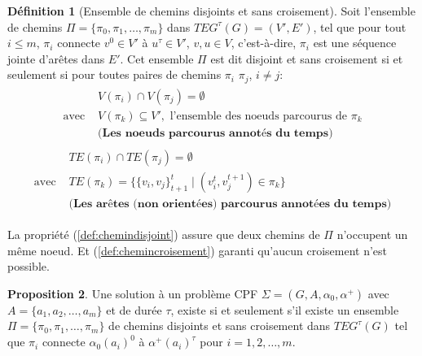 \documentclass[french, 12pt, letterpaper]{article}
\theoremstyle{definition}
\newtheorem{definition}{Définition}[subsection]
\theoremstyle{proposition}
\newtheorem{proposition}[definition]{Proposition}
\theoremstyle{example}
\begin{document}
    \begin{definition}[Ensemble de chemins disjoints et sans croisement]
        Soit l'ensemble de chemins $\Pi = \{\pi_0, \pi_1, \ldots, \pi_m\}$ dans $TEG^\tau(G) = (V', E')$,
        tel que pour tout $i \leq m$, $\pi_i$ connecte $v^0 \in V'$ à $u^\tau \in V'$, $v, u \in V$,
        c'est-à-dire, $\pi_i$ est une séquence jointe d'arêtes dans $E'$. 
        Cet ensemble $\Pi$ est dit disjoint et sans croisement si et seulement si
        pour toutes paires de chemins $\pi_i$ $\pi_j$, $i \neq j$:
        \begin{gather}
            \label{def:chemindisjoint}
            \begin{split}
            &V(\pi_i) \cap V(\pi_j) = \emptyset\\
            \text{avec } &V(\pi_k) \subseteq V',\text{ l'ensemble des noeuds parcourus de }\pi_k\\
            &\textbf{(Les noeuds parcourus annotés du temps)}
            \end{split}
        \end{gather}
        \begin{gather}
            \label{def:chemincroisement}
            \begin{split}
            &TE(\pi_i) \cap TE(\pi_j) = \emptyset\\
            \text{avec } &TE(\pi_k) = \{\{v_i, v_j\}^t_{t+1}  \;|\; ( v_i^t, v_j^{t+1} ) \in \pi_k \}\\
            &\textbf{(Les arêtes (non orientées) parcourus annotées du temps)}
            \end{split}
        \end{gather}

        La propriété (\ref{def:chemindisjoint}) assure que deux chemins de $\Pi$ n'occupent un même noeud. 
        Et (\ref{def:chemincroisement}) garanti qu'aucun croisement n'est possible.
    \end{definition}

    \begin{proposition}
        Une solution à un problème CPF $\Sigma = ( G, A, \alpha_0, \alpha^+ )$ avec $A = \{a_1, a_2, \ldots, a_m\}$ et de durée $\tau$,
        existe si et seulement s'il existe un ensemble $\Pi = \{\pi_0, \pi_1, \ldots, \pi_m\}$ de chemins disjoints et sans croisement dans $TEG^\tau(G)$
        tel que $\pi_i$ connecte $\alpha_0(a_i)^0$ à $\alpha^+(a_i)^\tau$ pour $i = 1, 2, \ldots, m$.
    \end{proposition}
\end{document}
